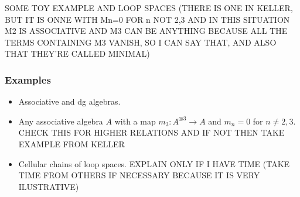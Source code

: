\documentclass{beamer}
\theoremstyle{definition}
\begin{document}
\begin{frame}
SOME TOY EXAMPLE AND LOOP SPACES (THERE IS ONE IN KELLER, BUT IT IS ONNE WITH Mn=0 FOR n NOT 2,3 AND IN THIS SITUATION M2 IS ASSOCIATIVE AND M3 CAN BE ANYTHING BECAUSE ALL THE TERMS CONTAINING M3 VANISH, SO I CAN SAY THAT, AND ALSO THAT THEY'RE CALLED MINIMAL)
\end{frame}

\begin{frame}
\frametitle{Examples}
\begin{itemize}
\item Associative and  dg algebras. %
\item Any associative algebra $A$ with a map $m_3:A^{\otimes 3}\to A$ and $m_n=0$ for $n\neq 2,3$. CHECK THIS FOR HIGHER RELATIONS AND IF NOT THEN TAKE EXAMPLE FROM KELLER %
\item Cellular chains of loop spaces. %
EXPLAIN ONLY IF I HAVE TIME (TAKE TIME FROM OTHERS IF NECESSARY BECAUSE IT IS VERY ILUSTRATIVE)
\end{itemize}
\end{frame}
\end{document}
